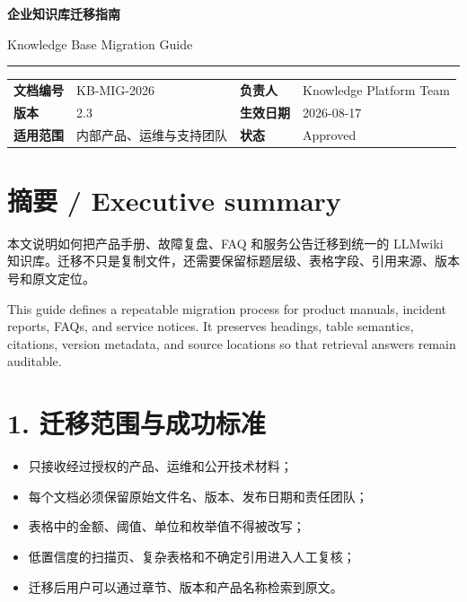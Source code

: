 \documentclass[10.5pt,a4paper]{article}
\begin{document}
{\color{navy}\fontsize{22}{27}\selectfont\bfseries 企业知识库迁移指南}\par
{\color{muted}\fontsize{13}{16}\selectfont Knowledge Base Migration Guide}\par\vspace{3mm}
{\color{blue}\rule{\textwidth}{2pt}}\par\vspace{5mm}
\begin{tabular}{>{\bfseries}p{28mm} p{55mm} >{\bfseries}p{28mm} p{55mm}}
文档编号 & KB-MIG-2026 & 负责人 & Knowledge Platform Team\\
版本 & 2.3 & 生效日期 & 2026-08-17\\
适用范围 & 内部产品、运维与支持团队 & 状态 & Approved\\
\end{tabular}
\vspace{7mm}
\section*{摘要 / Executive summary}
本文说明如何把产品手册、故障复盘、FAQ 和服务公告迁移到统一的 LLMwiki 知识库。迁移不只是复制文件，还需要保留标题层级、表格字段、引用来源、版本号和原文定位。

This guide defines a repeatable migration process for product manuals, incident reports, FAQs, and service notices. It preserves headings, table semantics, citations, version metadata, and source locations so that retrieval answers remain auditable.

\section*{1. 迁移范围与成功标准}
\begin{itemize}
\item 只接收经过授权的产品、运维和公开技术材料；
\item 每个文档必须保留原始文件名、版本、发布日期和责任团队；
\item 表格中的金额、阈值、单位和枚举值不得被改写；
\item 低置信度的扫描页、复杂表格和不确定引用进入人工复核；
\item 迁移后用户可以通过章节、版本和产品名称检索到原文。
\end{itemize}
\end{document}
